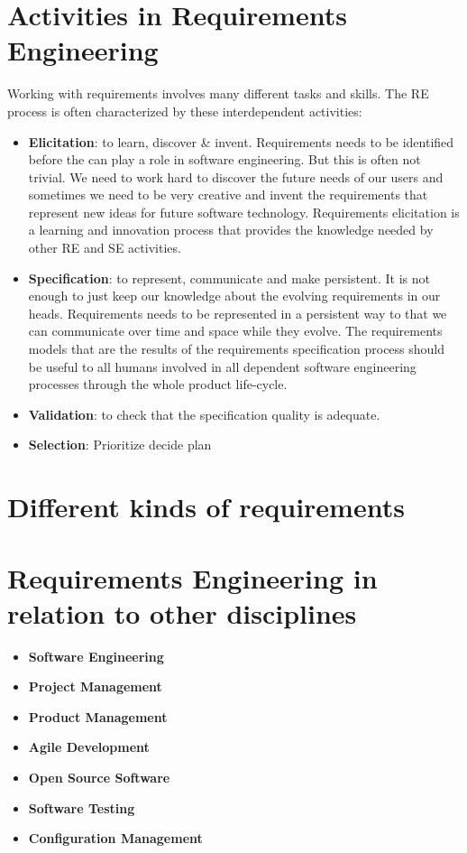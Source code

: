 \section*{Activities in Requirements Engineering}

Working with requirements involves many different tasks and skills. The RE process is often characterized by these interdependent activities: 

\begin{itemize}
  \item \textbf{Elicitation}: to learn, discover \& invent. Requirements needs to be identified before the can play a role in software engineering. But this is often not trivial. We need to work hard to discover the future needs of our users and sometimes we need to be very creative and invent the requirements that represent new ideas for future software technology. Requirements elicitation is a learning and innovation process that provides the knowledge needed by other RE and SE activities.
  \item \textbf{Specification}: to represent, communicate and make persistent. It is not enough to just keep our knowledge about the evolving requirements in our heads. Requirements needs to be represented in a persistent way to that we can communicate over time and space while they evolve. The requirements models that are the results of the requirements specification process should be useful to all humans involved in all dependent software engineering processes through the whole product life-cycle.
  \item \textbf{Validation}: to check that the specification quality is adequate. 
  \item \textbf{Selection}: Prioritize decide plan
\end{itemize}

\section*{Different kinds of requirements}



\section*{Requirements Engineering in relation to other disciplines}

\begin{itemize}
  \item \textbf{Software Engineering}
  \item \textbf{Project Management}
  \item \textbf{Product Management}
  \item \textbf{Agile Development}
  \item \textbf{Open Source Software}
  \item \textbf{Software Testing}
  \item \textbf{Configuration Management}
\end{itemize}

